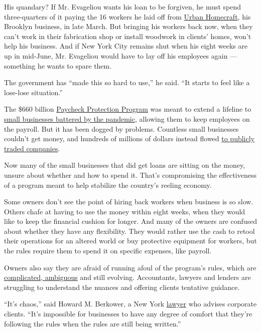 His quandary? If Mr. Evageliou wants his loan to be forgiven, he must
spend three-quarters of it paying the 16 workers he laid off from
\href{http://www.urbanhomecraft.com/about}{Urban Homecraft}, his
Brooklyn business, in late March. But bringing his workers back now,
when they can't work in their fabrication shop or install woodwork in
clients' homes, won't help his business. And if New York City remains
shut when his eight weeks are up in mid-June, Mr. Evageliou would have
to lay off his employees again --- something he wants to spare them.

The government has ``made this so hard to use,'' he said. ``It starts to
feel like a lose-lose situation.''

The \$660 billion
\href{https://www.nytimes3xbfgragh.onion/2020/06/30/us/politics/ppp-extension.html}{Paycheck
Protection Program} was meant to extend a lifeline to
\href{https://www.nytimes3xbfgragh.onion/2020/07/13/business/small-businesses-coronavirus.html}{small
businesses battered by the pandemic}, allowing them to keep employees on
the payroll. But it has been dogged by problems. Countless small
businesses couldn't get money, and hundreds of millions of dollars
instead flowed
\href{https://www.nytimes3xbfgragh.onion/2020/04/26/business/coronavirus-small-business-loans-large-companies.html}{to
publicly traded companies}.

Now many of the small businesses that did get loans are sitting on the
money, unsure about whether and how to spend it. That's compromising the
effectiveness of a program meant to help stabilize the country's reeling
economy.

Some owners don't see the point of hiring back workers when business is
so slow. Others chafe at having to use the money within eight weeks,
when they would like to keep the financial cushion for longer. And many
of the owners are confused about whether they have any flexibility. They
would rather use the cash to retool their operations for an altered
world or buy protective equipment for workers, but the rules require
them to spend it on specific expenses, like payroll.

Owners also say they are afraid of running afoul of the program's rules,
which are
\href{https://www.rklcpa.com/ppp-loan-forgiveness-known-unknown-action-items/}{complicated,
ambiguous} and still evolving. Accountants, lawyers and lenders are
struggling to understand the nuances and offering clients tentative
guidance.

``It's chaos,'' said Howard M. Berkower, a New York
\href{https://www.mccarter.com/people/howard-m-berkower/}{lawyer} who
advises corporate clients. ``It's impossible for businesses to have any
degree of comfort that they're following the rules when the rules are
still being written.''

